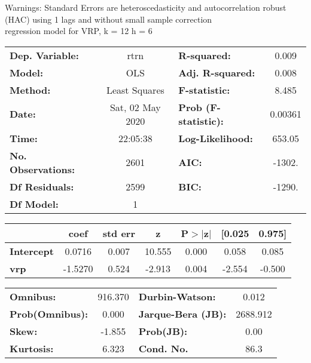 Warnings: \newline
 [1] Standard Errors are heteroscedasticity and autocorrelation robust (HAC) using 1 lags and without small sample correction\\ 

regression model for VRP, k = 12 h = 6\begin{center}
\begin{tabular}{lclc}
\toprule
\textbf{Dep. Variable:}    &       rtrn       & \textbf{  R-squared:         } &     0.009   \\
\textbf{Model:}            &       OLS        & \textbf{  Adj. R-squared:    } &     0.008   \\
\textbf{Method:}           &  Least Squares   & \textbf{  F-statistic:       } &     8.485   \\
\textbf{Date:}             & Sat, 02 May 2020 & \textbf{  Prob (F-statistic):} &  0.00361    \\
\textbf{Time:}             &     22:05:38     & \textbf{  Log-Likelihood:    } &    653.05   \\
\textbf{No. Observations:} &        2601      & \textbf{  AIC:               } &    -1302.   \\
\textbf{Df Residuals:}     &        2599      & \textbf{  BIC:               } &    -1290.   \\
\textbf{Df Model:}         &           1      & \textbf{                     } &             \\
\bottomrule
\end{tabular}
\begin{tabular}{lcccccc}
                   & \textbf{coef} & \textbf{std err} & \textbf{z} & \textbf{P$> |$z$|$} & \textbf{[0.025} & \textbf{0.975]}  \\
\midrule
\textbf{Intercept} &       0.0716  &        0.007     &    10.555  &         0.000        &        0.058    &        0.085     \\
\textbf{vrp}       &      -1.5270  &        0.524     &    -2.913  &         0.004        &       -2.554    &       -0.500     \\
\bottomrule
\end{tabular}
\begin{tabular}{lclc}
\textbf{Omnibus:}       & 916.370 & \textbf{  Durbin-Watson:     } &    0.012  \\
\textbf{Prob(Omnibus):} &   0.000 & \textbf{  Jarque-Bera (JB):  } & 2688.912  \\
\textbf{Skew:}          &  -1.855 & \textbf{  Prob(JB):          } &     0.00  \\
\textbf{Kurtosis:}      &   6.323 & \textbf{  Cond. No.          } &     86.3  \\
\bottomrule
\end{tabular}
\end{center}

